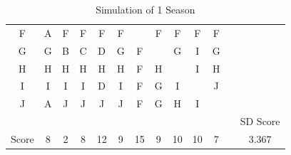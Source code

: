 \documentclass[12pt]{article}
\begin{document}
\begin{table}[h]
\begin{tabular}{ccccccccccccc}
F     & A     & F     & F     & F     & F     &       & F     & F     & F     & F     &  &          \\
G     & G     & B     & C     & D     & G     & F     &       & G     & I     & G     &  &          \\
H     & H     & H     & H     & H     & H     & F     & H     &       & I     & H     &  &          \\
I     & I     & I     & I     & D     & I     & F     & G     & I     &       & J     &  &          \\
J     & A     & J     & J     & J     & J     & F     & G     & H     & I     &       &  &          \\
      &       &       &       &       &       &       &       &       &       &       &  & SD Score \\
Score & 8     & 2     & 8     & 12    & 9     & 15    & 9     & 10    & 10    & 7     &  & 3.367   
\end{tabular}
\caption{Simulation of 1 Season}
\end{table}
\end{document}
